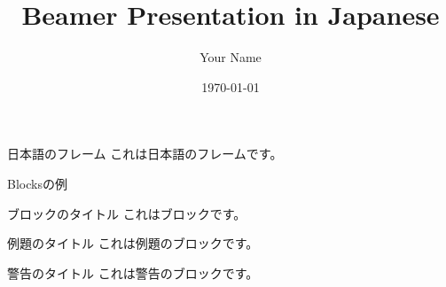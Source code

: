 \documentclass[unicode,aspectratio=169, 12pt]{beamer}
\title{Beamer Presentation in Japanese}
\author{Your Name}
\date{\today}
\begin{document}
\begin{frame}
  \titlepage
\end{frame}

\begin{frame}{日本語のフレーム}
  これは日本語のフレームです。
\end{frame}

\begin{frame}{Blocksの例}
  \begin{block}{ブロックのタイトル}
    これはブロックです。
  \end{block}

  \begin{exampleblock}{例題のタイトル}
    これは例題のブロックです。
  \end{exampleblock}

  \begin{alertblock}{警告のタイトル}
    これは警告のブロックです。
  \end{alertblock}
\end{frame}
\end{document}
